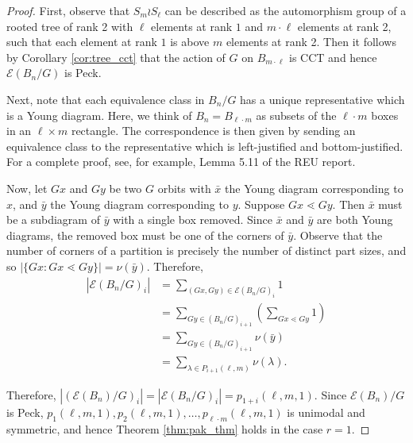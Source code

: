 \documentclass[smallextended, envcountsame, numbook]{svjour3}
\theoremstyle{plain}
\theoremstyle{definition}
\theoremstyle{remark}
\numberwithin{equation}{section}
\begin{document}
\begin{proof}

First, observe that $S_m \wr S_\ell$ can be described as the automorphism group of a rooted tree of rank 2 with $\ell$ elements at rank $1$ and $m\cdot \ell$ elements at rank 2, such that each element at rank $1$ is above $m$ elements at rank 2. Then it follows by Corollary \ref{cor:tree_cct} that the action of $G$ on $B_{m \cdot \ell}$ is CCT and hence $\mathcal E(B_n/G)$ is Peck.

Next, note that each equivalence class in $B_n/G$ has a unique representative which is a Young diagram.  Here, we think of $B_n = B_{\ell \cdot m}$ as subsets of the $\ell \cdot m$ boxes in an $\ell \times m$ rectangle. The correspondence is then given by sending an equivalence class to the representative which is left-justified and bottom-justified.
 For a complete proof, see, for example, Lemma 5.11 of the REU report.

Now, let $Gx$ and $Gy$ be two $G$ orbits with $\bar x$ the Young diagram corresponding to $x$, and $\bar y$ the Young diagram corresponding to $y$. Suppose $Gx \lessdot Gy$. Then $\bar x$ must be a subdiagram of $\bar y$ with a single box removed. Since $\bar x$ and $\bar y$ are both Young diagrams, the removed box must be one of the corners of $\bar y$. Observe that the number of corners of a partition is precisely the number of distinct part sizes, and so $|\{Gx\colon Gx \lessdot Gy\}| = \nu(\bar y)$. Therefore,
\begin{align*}
  |\mathcal E(B_n/G)_i| &= \sum_{(Gx,Gy) \in \mathcal E(B_n/G)_i} 1 
  \\
  &= \sum_{Gy \in (B_n/G)_{i+1}} \left(\sum_{Gx \lessdot Gy}^{} 1 \right) 
  \\
  &= \sum_{Gy \in (B_n/G)_{i+1}}\nu(\bar y) 
  \\
  &=  \sum_{\lambda \in P_{i+1}(\ell,m)} \nu(\lambda).
\end{align*}

Therefore, $|(\mathcal E(B_n)/G)_i| = |\mathcal E(B_n/G)_i| = p_{1+i}(\ell,m,1)$. Since $\mathcal E(B_n)/G$ is Peck,
\linebreak
$p_1(\ell,m,1), p_{2}(\ell,m,1),\ldots, p_{\ell\cdot m}(\ell,m,1)$ is unimodal and symmetric, and hence Theorem \ref{thm:pak_thm} holds in the case $r = 1$.
\end{proof}






\end{document}
